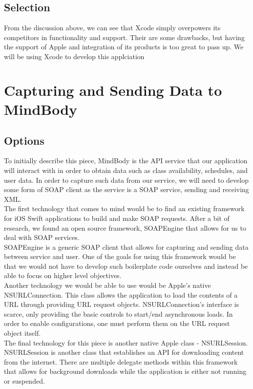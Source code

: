 \documentclass[letterpaper,10pt,titlepage]{article}
\begin{document}
\subsection{Selection}
From the discussion above, we can see that Xcode simply overpowers its competitors in functionality and support. Their are some drawbacks, but having the support of Apple and integration of its products is too great to pass up. We will be using Xcode to develop this applciation


\section{Capturing and Sending Data to MindBody}

\subsection{Options}

To initially describe this piece, MindBody is the API service that our application will interact with in order to obtain data such as class availability, schedules, and user data. In order to capture such data from our service, we will need to develop some form of SOAP client as the service is a SOAP service, sending and receiving XML.\\

The first technology that comes to mind would be to find an existing framework for iOS Swift applications to build and make SOAP requests. After a bit of research, we found an open source framework, SOAPEngine that allows for us to deal with SOAP services.\\

SOAPEngine is a generic SOAP client that allows for capturing and sending data between service and user. One of the goals for using this framework would be that we would not have to develop such boilerplate code ourselves and instead be able to focus on higher level objectives.\\

Another technology we would be able to use would be Apple's native NSURLConnection. This class allows the application to load the contents of a URL through providing URL request objects. NSURLConnection's interface is scarce, only providing the basic controls to start/end asynchronous loads.\cite{networking2} In order to enable configurations, one must perform them on the URL request object itself.\\

The final technology for this piece is another native Apple class - NSURLSession. NSURLSession is another class that establishes an API for downloading content from the internet.\cite{networking1} There are multiple delegate methods within this framework that allows for background downloads while the application is either not running or suspended.\\
\end{document}
